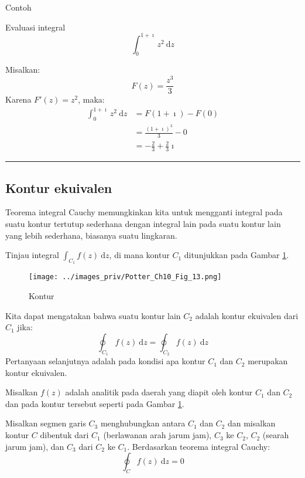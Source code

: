 Contoh

Evaluasi integral
\begin{equation*}
\int_{0}^{1 + \imath}z^{2}\ \mathrm{d}z
\end{equation*}

Misalkan:
\begin{equation*}
F(z)=\frac{z^{3}}{3}
\end{equation*}
Karena $F'(z) = z^{2}$, maka:
\begin{align*}
\int_{0}^{1+\imath}z^{2}\ \mathrm{d}z & =F(1+\imath)-F(0)\\
 & =\frac{(1+\imath)^{3}}{3}-0\\
 & =-\frac{2}{3}+\frac{2}{3}\imath
\end{align*}

\rule[0.5ex]{1\columnwidth}{1pt}

\subsection{Kontur ekuivalen}

Teorema integral Cauchy memungkinkan kita untuk mengganti integral
pada suatu kontur tertutup sederhana dengan integral lain pada suatu
kontur lain yang lebih sederhana, biasanya suatu lingkaran.

Tinjau integral $\int_{C_{1}}f(z)\ \mathrm{d}z$, di mana kontur $C_{1}$
ditunjukkan pada Gambar \ref{fig:Potter_Fig_10_13}.

\begin{figure}[h]
{\centering
\texttt{[image: ../images\_priv/Potter\_Ch10\_Fig\_13.png]}
\par}
\caption{Kontur}\label{fig:Potter_Fig_10_13}
\end{figure}

Kita dapat mengatakan bahwa suatu kontur lain $C_{2}$ adalah kontur
ekuivalen dari $C_{1}$ jika:
\begin{equation*}
\oint_{C_{1}}f(z)\ \mathrm{d}z=\oint_{C_{2}}f(z)\ \mathrm{d}z
\end{equation*}
Pertanyaan selanjutnya adalah pada kondisi apa kontur $C_{1}$ dan
$C_{2}$ merupakan kontur ekuivalen.

Misalkan $f(z)$ adalah analitik pada daerah yang diapit oleh kontur
$C_{1}$ dan $C_{2}$ dan pada kontur tersebut seperti pada Gambar
\ref{fig:Potter_Fig_10_13}.

Misalkan segmen garis $C_{3}$ menghubungkan antara $C_{1}$ dan $C_{2}$
dan misalkan kontur $C$ dibentuk dari $C_{1}$ (berlawanan arah jarum
jam), $C_{3}$ ke $C_{2}$, $C_{2}$ (searah jarum jam), dan $C_{3}$
dari $C_{2}$ ke $C_{1}$. Berdasarkan teorema integral Cauchy:
\begin{equation*}
\oint_{C}f(z)\ \mathrm{d}z=0
\end{equation*}

